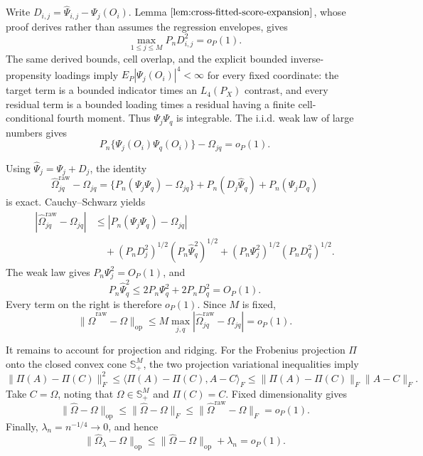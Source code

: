 Write \(D_{i,j}=\widehat\Psi_{i,j}-\Psi_j(O_i)\). Lemma \(\ref{lem:cross-fitted-score-expansion}\), whose proof derives rather than assumes the regression envelopes, gives
\[
 \max_{1\le j\le M}P_nD_{i,j}^2=o_P(1).
\]
The same derived bounds, cell overlap, and the explicit bounded inverse-propensity loadings imply \(E_P|\Psi_j(O_i)|^4<\infty\) for every fixed coordinate: the target term is a bounded indicator times an \(L_4(P_X)\) contrast, and every residual term is a bounded loading times a residual having a finite cell-conditional fourth moment. Thus \(\Psi_j\Psi_q\) is integrable. The i.i.d. weak law of large numbers gives
\[
 P_n\{\Psi_j(O_i)\Psi_q(O_i)\}-\Omega_{jq}=o_P(1).
\]

Using \(\widehat\Psi_j=\Psi_j+D_j\), the identity
\[
 \widehat\Omega^{\mathrm{raw}}_{jq}-\Omega_{jq}
 =\{P_n(\Psi_j\Psi_q)-\Omega_{jq}\}
  +P_n(D_j\widehat\Psi_q)+P_n(\Psi_jD_q)
\]
is exact. Cauchy--Schwarz yields
\[
\begin{aligned}
 |\widehat\Omega^{\mathrm{raw}}_{jq}-\Omega_{jq}|
 &\le |P_n(\Psi_j\Psi_q)-\Omega_{jq}|\\
 &\quad +(P_nD_j^2)^{1/2}(P_n\widehat\Psi_q^2)^{1/2}
 +(P_n\Psi_j^2)^{1/2}(P_nD_q^2)^{1/2}.
\end{aligned}
\]
The weak law gives \(P_n\Psi_j^2=O_P(1)\), and
\[
 P_n\widehat\Psi_q^2\le2P_n\Psi_q^2+2P_nD_q^2=O_P(1).
\]
Every term on the right is therefore \(o_P(1)\). Since \(M\) is fixed,
\[
 \|\widehat\Omega^{\mathrm{raw}}-\Omega\|_{\mathrm{op}}
 \le M\max_{j,q}|\widehat\Omega^{\mathrm{raw}}_{jq}-\Omega_{jq}|=o_P(1).
\]

It remains to account for projection and ridging. For the Frobenius projection \(\Pi\) onto the closed convex cone \(\mathbb S_+^M\), the two projection variational inequalities imply
\[
 \|\Pi(A)-\Pi(C)\|_F^2
 \le\langle\Pi(A)-\Pi(C),A-C\rangle_F
 \le\|\Pi(A)-\Pi(C)\|_F\|A-C\|_F.
\]
Take \(C=\Omega\), noting that \(\Omega\in\mathbb S_+^M\) and \(\Pi(C)=C\). Fixed dimensionality gives
\[
 \|\widehat\Omega-\Omega\|_{\mathrm{op}}
 \le\|\widehat\Omega-\Omega\|_F
 \le\|\widehat\Omega^{\mathrm{raw}}-\Omega\|_F=o_P(1).
\]
Finally, \(\lambda_n=n^{-1/4}\to0\), and hence
\[
 \|\widehat\Omega_\lambda-\Omega\|_{\mathrm{op}}
 \le\|\widehat\Omega-\Omega\|_{\mathrm{op}}+\lambda_n=o_P(1).
\]